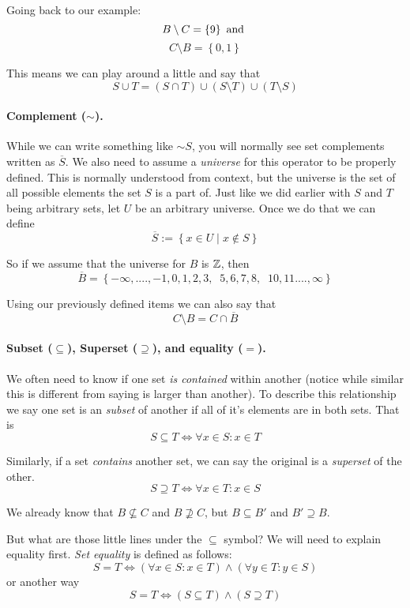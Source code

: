 Going back to our example:
\[
B \setminus C = \left\{9\right\}\textnormal{ and }
\] \[
C \setminus B = \left\{0,1\right\}
\]

This means we can play around a little and say that 
\[
S \cup T = \left(S \cap T\right) \cup \left(S \setminus T\right) \cup  \left(T \setminus S\right) 
\]

\paragraph{Complement ($\sim$).}
While we can write something like $\sim S$, you will normally see set complements written as $\overline{S}$. 
We also need to assume a \emph{universe} for this operator to be properly defined. 
This is normally understood from context, but the universe is the set of all possible elements the set $S$ is a part of. 
Just like we did earlier with $S$ and $T$ being arbitrary sets, let $U$ be an arbitrary universe.
Once we do that we can define 
\[
\overline{S} := \left\{x \in U \mid x \notin S\right\}
\]

So if we assume that the universe for $B$ is $\operatorname{\mathbb{Z}}$,
then 
\[
\overline{B} = \left\{-\infty,....,-1,0,1,2,3,\;\;5,6,7,8,\;\;10,11....,\infty\right\} 
\]

Using our previously defined items we can also say that 
\[
C \setminus B = C \cap \overline{B}
\]

\paragraph{Subset ($\subseteq$), Superset ($\supseteq$), and equality ($=$).}
We often need to know if one set \textit{is contained} within another (notice while similar this is different from saying is larger than another). 
To describe this relationship we say one set is an \emph{subset} of another if all of it's elements are in both sets. 
That is
\[
S \subseteq T \iff \forall x \in S : x \in T
\]

Similarly, if a set \textit{contains} another set, we can say the original is a \emph{superset} of the other. 
\[
S \supseteq T \iff \forall x \in T: x \in S
\] 

We already know that $B \nsubseteq C$ and $B \nsupseteq C$, but $B \subseteq B'$ and $B' \supseteq B$. 

But what are those little lines under the $\subseteq$ symbol? We will need to explain equality first. 
\emph{Set equality} is defined as follows:
\[
S = T \iff \left(\forall x \in S : x \in T\right) \wedge \left(\forall y \in T : y \in S\right)
\]
or another way
\[
S = T \iff \left(S \subseteq T\right) \wedge \left(S \supseteq T\right)
\]

